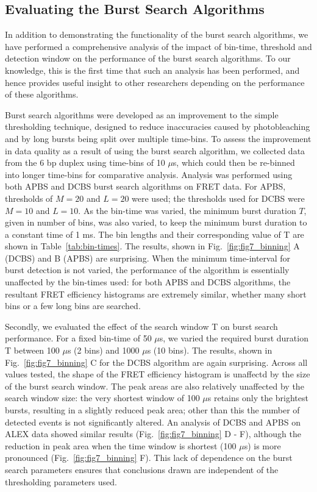 \subsection*{Evaluating the Burst Search Algorithms}
In addition to demonstrating the functionality of the burst search algorithms, we have performed a comprehensive analysis of the impact of bin-time, threshold and detection window on the performance of the burst search algorithms. To our knowledge, this is the first time that such an analysis has been performed, and hence provides useful insight to other researchers depending on the performance of these algorithms.

Burst search algorithms were developed as an improvement to the simple thresholding technique, designed to reduce inaccuracies caused by photobleaching and by long bursts being split over multiple time-bins. To assess the improvement in data quality as a result of using the burst search algorithm, we collected data from the 6 bp duplex using time-bins of 10 $\mu$s, which could then be re-binned into longer time-bins for comparative analysis. Analysis was performed using both APBS and DCBS burst search algorithms on FRET data. For APBS, thresholds of $M=20$ and $L=20$ were used; the thresholds used for DCBS were $M = 10$ and $L = 10$. As the bin-time was varied, the minimum burst duration $T$, given in number of bins, was also varied, to keep the minimum burst duration to a constant time of 1 ms. The bin lengths and their corresponding value of T are shown in Table~\ref{tab:bin-times}. The results, shown in Fig.~\ref{fig:fig7_binning} A (DCBS) and B (APBS) are surprising. When the minimum time-interval for burst detection is not varied, the performance of the algorithm is essentially unaffected by the bin-times used: for both APBS and DCBS algorithms, the resultant FRET efficiency histograms are extremely similar, whether many short bins or a few long bins are searched.

Secondly, we evaluated the effect of the search window T on burst search performance. For a fixed bin-time of 50 $\mu$s, we varied the required burst duration T between 100 $\mu$s (2 bins) and 1000 $\mu$s (10 bins). The results, shown in Fig.~\ref{fig:fig7_binning} C for the DCBS algorithm are again surprising. Across all values tested, the shape of the FRET efficiency histogram is unaffectd by the size of the burst search window. The peak areas are also relatively unaffected by the search window size: the very shortest window of 100 $\mu$s retains only the brightest bursts, resulting in a slightly reduced peak area; other than this the number of detected events is not significantly altered. An analysis of DCBS and APBS on ALEX data showed similar results (Fig.~\ref{fig:fig7_binning} D - F), although the reduction in peak area when the time window is shortest (100 $\mu$s) is more pronounced (Fig.~\ref{fig:fig7_binning} F). This lack of dependence on the burst search parameters ensures that conclusions drawn are independent of the thresholding parameters used.

